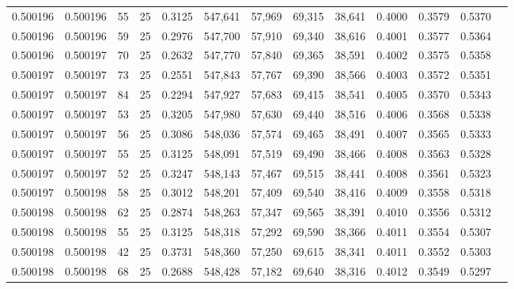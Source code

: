 \begin{tabular}{rrrrrrrrrrrrr}
0.500196 & 0.500196 &    55 &  25 &                                     0.3125 & 547,641 &  57,969 &  69,315 &  38,641 & 0.4000 & 0.3579 & 0.5370 \\
0.500196 & 0.500196 &    59 &  25 &                                     0.2976 & 547,700 &  57,910 &  69,340 &  38,616 & 0.4001 & 0.3577 & 0.5364 \\
0.500196 & 0.500197 &    70 &  25 &                                     0.2632 & 547,770 &  57,840 &  69,365 &  38,591 & 0.4002 & 0.3575 & 0.5358 \\
0.500197 & 0.500197 &    73 &  25 &                                     0.2551 & 547,843 &  57,767 &  69,390 &  38,566 & 0.4003 & 0.3572 & 0.5351 \\
0.500197 & 0.500197 &    84 &  25 &                                     0.2294 & 547,927 &  57,683 &  69,415 &  38,541 & 0.4005 & 0.3570 & 0.5343 \\
0.500197 & 0.500197 &    53 &  25 &                                     0.3205 & 547,980 &  57,630 &  69,440 &  38,516 & 0.4006 & 0.3568 & 0.5338 \\
0.500197 & 0.500197 &    56 &  25 &                                     0.3086 & 548,036 &  57,574 &  69,465 &  38,491 & 0.4007 & 0.3565 & 0.5333 \\
0.500197 & 0.500197 &    55 &  25 &                                     0.3125 & 548,091 &  57,519 &  69,490 &  38,466 & 0.4008 & 0.3563 & 0.5328 \\
0.500197 & 0.500197 &    52 &  25 &                                     0.3247 & 548,143 &  57,467 &  69,515 &  38,441 & 0.4008 & 0.3561 & 0.5323 \\
0.500197 & 0.500198 &    58 &  25 &                                     0.3012 & 548,201 &  57,409 &  69,540 &  38,416 & 0.4009 & 0.3558 & 0.5318 \\
0.500198 & 0.500198 &    62 &  25 &                                     0.2874 & 548,263 &  57,347 &  69,565 &  38,391 & 0.4010 & 0.3556 & 0.5312 \\
0.500198 & 0.500198 &    55 &  25 &                                     0.3125 & 548,318 &  57,292 &  69,590 &  38,366 & 0.4011 & 0.3554 & 0.5307 \\
0.500198 & 0.500198 &    42 &  25 &                                     0.3731 & 548,360 &  57,250 &  69,615 &  38,341 & 0.4011 & 0.3552 & 0.5303 \\
0.500198 & 0.500198 &    68 &  25 &                                     0.2688 & 548,428 &  57,182 &  69,640 &  38,316 & 0.4012 & 0.3549 & 0.5297 \\

\end{tabular}
